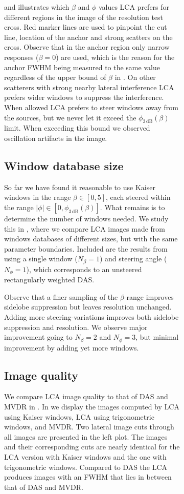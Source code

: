 \begin{figure}[tbp]
\begin{figure}[tbp]
\begin{figure*}[t]
\begin{figure*}[tbp]
\begin{figure*}[tb]
 and  illustrates which $\beta$ and $\phi$ values LCA prefers for different regions in the image of the resolution test cross. Red marker lines are used to pinpoint the cut line, location of the anchor and strong scatters on the cross. Observe that in the anchor region only narrow responses ($\beta=0$) are used, which is the reason for the anchor FWHM being measured to the same value regardless of the upper bound of $\beta$ in . On other scatterers with strong nearby lateral interference LCA prefers wider windows to suppress the interference. When allowed LCA prefers to steer windows away from the sources, but we never let it exceed the $\phi_\mathrm{3\,dB}(\beta)$ limit. When exceeding this bound we observed oscillation artifacts in the image.


\subsection{Window database size}\label{III_sec:results_database_size}

So far we have found it reasonable to use Kaiser windows in the range $\beta\in[0,5]$, each steered within the range $|\phi|\in[0,\phi_\mathrm{3\,dB}(\beta)]$. What remains is to determine the number of windows needed. We study this in , where we compare LCA images made from windows databases of different sizes, but with the same parameter boundaries. Included are the results from using a single window ($N_\beta=1$) and steering angle ($N_\phi=1$), which corresponds to an unsteered rectangularly weighted DAS.

Observe that a finer sampling of the $\beta$-range improves sidelobe suppression but leaves resolution unchanged. Adding more steering-variations improves both sidelobe suppression and resolution. We observe major improvement going to $N_\beta=2$ and $N_\phi=3$, but minimal improvement by adding yet more windows.


\subsection{Image quality}\label{III_sec:results_image_quality}

We compare LCA image quality to that of DAS and MVDR in . In  we display the images computed by LCA using Kaiser windows, LCA using trigonometric windows, and MVDR. Two lateral image cuts through all images are presented in the left plot. The images and their corresponding cuts are nearly identical for the LCA version with Kaiser windows and the one with trigonometric windows. Compared to DAS the LCA produces images with an FWHM that lies in between that of DAS and MVDR.


\end{figure*}
\end{figure*}
\end{figure*}
\end{figure}
\end{figure}
